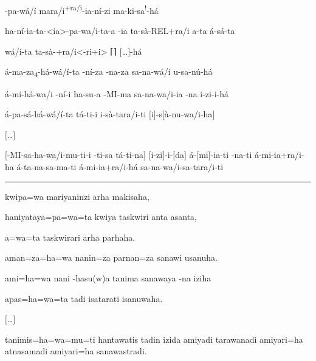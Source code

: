 \bigskip
\setcounter{parcount}{10}
\begin{parnumbersr}

	\raggedright%
	\itshape%


	-pa-wá/í \lmasc{}mara/i\textsuperscript{+ra/i}-ia-ní-zi
	\lmasc{} \lmasc{}ma-ki-sa\textsuperscript{!}-há \lmasc{}\lmasc{}


	\lmasc{}ha-ní-ia-ta-<ia>-pa-wa/i-ta-a \lmasc{}-ia
	\lmasc{}ta-sà-REL+ra/i \lmasc{}a-ta \lmasc{}á-sá-ta


	\lmasc{}wá/í-ta ta-sà-+ra/i<-ri+i>
	 \lmasc{}\textsc{⌈}\textsc{⌉} $[$…$]$-há

	\lmasc{}á-ma\lmasc{}\lmasc{}-za\textsubscript{4}-há-wá/í-ta
	\lmasc{}-ní-za
	\lmasc{}-na-za \lmasc{}sa-na-wá/í
	\lmasc{}u-sa-nú-há

	\lmasc{}á-mi-há-wa/i \lmasc{}-ní-i
	\lmasc{}ha-su-a \lmasc{}-MI-ma
	\lmasc{}\lmasc{} sa-na-wa/i-ia
	\lmasc{}-na i-zi-i-há

	\lmasc{}á-pa-sá-há-wá/í-ta \lmasc{}tá-ti-i
	\lmasc{}i-sà-tara/i-ti
	\lmasc{}$[$i$]$-s$[$à-nu-wa/i-ha$]$

	$[$\ldots$]$

	$[$\lmasc{}-MI-sa-ha-wa/i-mu-ti-i -ti-sa
					\lmasc{}tá-ti-na$]$ \lmasc{}$[$i-zi$]$-i-$[$da$]$
	\lmasc{}á-$[$mi$]$-ia-ti
	\lmasc{}-na-ti \lmasc{}á-mi-ia+ra/i-ha
	\lmasc{}á-ta-na-sa-ma-ti \lmasc{}á-mi-ia+ra/i-há
	\lmasc{}\lmasc{} \lmasc{}sa-na-wa/i-sa-tara/i-ti



\end{parnumbersr}

\vspace{10pt}
\hrule
\vspace{10pt}

\setcounter{parcount}{10}
\begin{parnumbersr}

	\raggedright%
	\itshape%

	kwipa=wa mariyaninzi arha makisaha,

	haniyataya=pa=wa=ta kwiya taskwiri anta asanta,

	a=wa=ta taskwirari arha parhaha.

	aman=za=ha=wa nanin=za parnan=za sanawi usanuha.

	ami=ha=wa nani -hasu{(w)}a tanima sanawaya -na iziha

	apas=ha=wa=ta tadi isatarati isanuwaha.

	$[$\ldots{}$]$

	tanimis=ha=wa=mu=ti hantawatis tadin izida amiyadi tarawanadi amiyari=ha
	atnasamadi amiyari=ha sanawastradi.

\end{parnumbersr}

